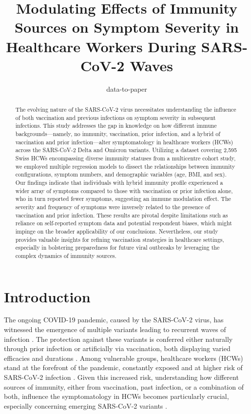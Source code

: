 \documentclass[11pt]{article}
\title{Modulating Effects of Immunity Sources on Symptom Severity in Healthcare Workers During SARS-CoV-2 Waves}
\author{data-to-paper}
\begin{document}
\maketitle
\begin{abstract}
The evolving nature of the SARS-CoV-2 virus necessitates understanding the influence of both vaccination and previous infections on symptom severity in subsequent infections. This study addresses the gap in knowledge on how different immune backgrounds—namely, no immunity, vaccination, prior infection, and a hybrid of vaccination and prior infection—alter symptomatology in healthcare workers (HCWs) across the SARS-CoV-2 Delta and Omicron variants. Utilizing a dataset covering 2,595 Swiss HCWs encompassing diverse immunity statuses from a multicentre cohort study, we employed multiple regression models to dissect the relationships between immunity configurations, symptom numbers, and demographic variables (age, BMI, and sex). Our findings indicate that individuals with hybrid immunity profile experienced a wider array of symptoms compared to those with vaccination or prior infection alone, who in turn reported fewer symptoms, suggesting an immune modulation effect. The severity and frequency of symptoms were inversely related to the presence of vaccination and prior infection. These results are pivotal despite limitations such as reliance on self-reported symptom data and potential respondent biases, which might impinge on the broader applicability of our conclusions. Nevertheless, our study provides valuable insights for refining vaccination strategies in healthcare settings, especially in bolstering preparedness for future viral outbreaks by leveraging the complex dynamics of immunity sources. 
\end{abstract}
\section*{Introduction}

The ongoing COVID-19 pandemic, caused by the SARS-CoV-2 virus, has witnessed the emergence of multiple variants leading to recurrent waves of infection \cite{Hall2022ProtectionAS, Suryawanshi2022LimitedCI}. The protection against these variants is conferred either naturally through prior infection or artificially via vaccination, both displaying varied efficacies and durations \cite{Dagan2021BNT162b2MC, Gobbi2021AntibodyRT, Haas2021ImpactAE}. Among vulnerable groups, healthcare workers (HCWs) stand at the forefront of the pandemic, constantly exposed and at higher risk of SARS-CoV-2 infection \cite{FernndezdelasPeas2022LongCOVIDSI}. Given this increased risk, understanding how different sources of immunity, either from vaccination, past infection, or a combination of both, influence the symptomatology in HCWs becomes particularly crucial, especially concerning emerging SARS-CoV-2 variants \cite{Bernal2021EarlyEO, Crawford2020DynamicsON, Gaebler2021EvolutionOA, Conti2020CoronavirusCA, Sattler2020SARSCoV2ST}.
\end{document}
